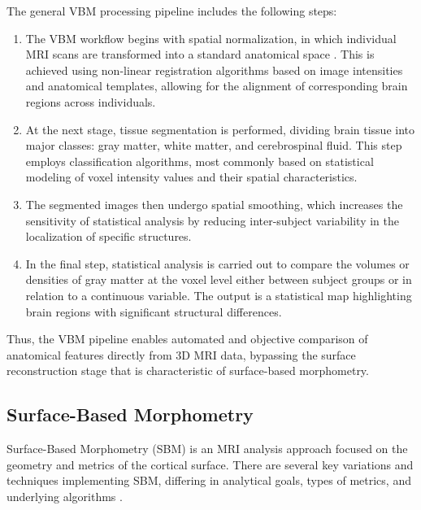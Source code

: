 \documentclass[default]{subfiles}
\begin{document}
The general VBM processing pipeline includes the following steps:\newline

\begin{enumerate}
    \item The VBM workflow begins with spatial normalization, in which individual MRI scans are transformed into a
    standard anatomical space \cite{desikan_2006}. This is achieved using non-linear registration algorithms based on
    image intensities and anatomical templates, allowing for the alignment of corresponding brain regions across
    individuals.
    
    \item At the next stage, tissue segmentation is performed, dividing brain tissue into major classes: gray matter,
    white matter, and cerebrospinal fluid. This step employs classification algorithms, most commonly based on
    statistical modeling of voxel intensity values and their spatial characteristics.
    
    \item  The segmented images then undergo spatial smoothing, which increases the sensitivity of statistical analysis
    by reducing inter-subject variability in the localization of specific structures.
    
    \item  In the final step, statistical analysis is carried out to compare the volumes or densities of gray matter at
    the voxel level either between subject groups or in relation to a continuous variable. The output is a statistical
    map highlighting brain regions with significant structural differences.\newline
\end{enumerate}


Thus, the VBM pipeline enables automated and objective comparison of anatomical features directly from 3D MRI data,
bypassing the surface reconstruction stage that is characteristic of surface-based morphometry.

\subsection{Surface-Based Morphometry}
Surface-Based Morphometry (SBM) is an MRI analysis approach focused on the geometry and metrics of the cortical
surface. There are several key variations and techniques implementing SBM, differing in analytical goals, types of
metrics, and underlying algorithms \cite{riccelli_2017}.
\end{document}
